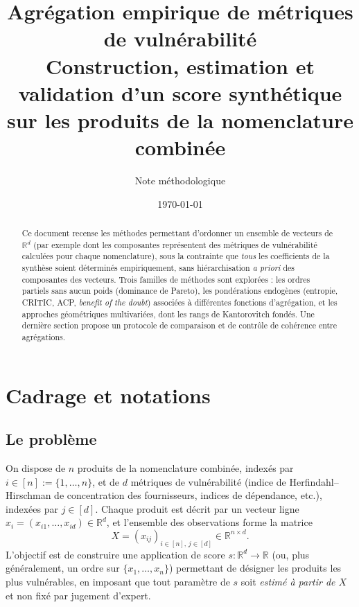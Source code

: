 \documentclass[11pt,a4paper]{article}
\title{\textbf{Agrégation empirique de métriques de vulnérabilité}\\[0.3em]
\large Construction, estimation et validation d'un score synthétique\\ sur les produits de la nomenclature combinée}
\author{Note méthodologique}
\date{\today}
\theoremstyle{definition}
\theoremstyle{remark}
\newcommand{\R}{\mathbb{R}}
\begin{document}
\maketitle

\begin{abstract}
\noindent
Ce document recense les méthodes permettant d'ordonner un ensemble de vecteurs de $\R^d$ (par exemple dont les composantes représentent des métriques de vulnérabilité calculées pour chaque nomenclature), sous la contrainte que \emph{tous} les
coefficients de la synthèse soient déterminés empiriquement, sans hiérarchisation \emph{a priori}
des composantes des vecteurs. Trois familles de méthodes sont explorées : les ordres partiels sans aucun poids (dominance de
Pareto), les pondérations endogènes (entropie, CRITIC, ACP, \emph{benefit of the doubt}) associées
à différentes fonctions d'agrégation, et les approches géométriques multivariées, dont les rangs
de Kantorovitch fondés.
Une dernière section propose un protocole de comparaison et de contrôle de cohérence entre
agrégations.
\end{abstract}

\vspace{0.5em}
{\small\tableofcontents}
\newpage

\section{Cadrage et notations}

\subsection{Le problème}

\medskip

On dispose de $n$ produits de la nomenclature combinée, indexés par $i \in [n] := \{1,\dots,n\}$,
et de $d$ métriques de vulnérabilité (indice de Herfindahl--Hirschman de concentration des
fournisseurs, indices de dépendance, etc.), indexées par $j \in [d]$. Chaque produit est décrit
par un vecteur ligne $x_i = (x_{i1},\dots,x_{id}) \in \R^d$, et l'ensemble des observations forme
la matrice
\[
X = (x_{ij})_{i\in[n],\,j\in[d]} \in \R^{n\times d}.
\]
L'objectif est de construire une application de score $s : \R^d \to \R$ (ou, plus généralement,
un ordre sur $\{x_1,\dots,x_n\}$) permettant de désigner les produits les plus vulnérables, en
imposant que tout paramètre de $s$ soit \emph{estimé à partir de $X$} et non fixé par jugement
d'expert.
\end{document}
